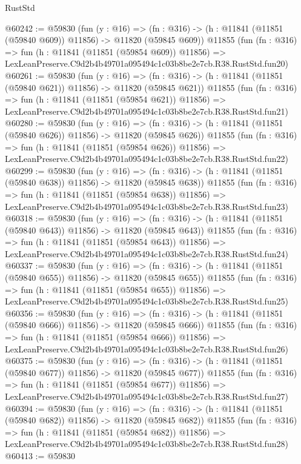 \begin{lexlean}{RustStd}
\begin{coremodule}
@60242 := @59830
    (fun (y : @16) =>
    (fn : @316) -> (h : @11841 (@11851 (@59840 @609)) @11856) -> @11820 (@59845 @609))
    @11855
    (fun (fn : @316) =>
    fun (h : @11841 (@11851 (@59854 @609)) @11856) =>
    LexLeanPreserve.C9d2b4b49701a095494c1c03b8be2e7cb.R38.RustStd.fun20)
@60261 := @59830
    (fun (y : @16) =>
    (fn : @316) -> (h : @11841 (@11851 (@59840 @621)) @11856) -> @11820 (@59845 @621))
    @11855
    (fun (fn : @316) =>
    fun (h : @11841 (@11851 (@59854 @621)) @11856) =>
    LexLeanPreserve.C9d2b4b49701a095494c1c03b8be2e7cb.R38.RustStd.fun21)
@60280 := @59830
    (fun (y : @16) =>
    (fn : @316) -> (h : @11841 (@11851 (@59840 @626)) @11856) -> @11820 (@59845 @626))
    @11855
    (fun (fn : @316) =>
    fun (h : @11841 (@11851 (@59854 @626)) @11856) =>
    LexLeanPreserve.C9d2b4b49701a095494c1c03b8be2e7cb.R38.RustStd.fun22)
@60299 := @59830
    (fun (y : @16) =>
    (fn : @316) -> (h : @11841 (@11851 (@59840 @638)) @11856) -> @11820 (@59845 @638))
    @11855
    (fun (fn : @316) =>
    fun (h : @11841 (@11851 (@59854 @638)) @11856) =>
    LexLeanPreserve.C9d2b4b49701a095494c1c03b8be2e7cb.R38.RustStd.fun23)
@60318 := @59830
    (fun (y : @16) =>
    (fn : @316) -> (h : @11841 (@11851 (@59840 @643)) @11856) -> @11820 (@59845 @643))
    @11855
    (fun (fn : @316) =>
    fun (h : @11841 (@11851 (@59854 @643)) @11856) =>
    LexLeanPreserve.C9d2b4b49701a095494c1c03b8be2e7cb.R38.RustStd.fun24)
@60337 := @59830
    (fun (y : @16) =>
    (fn : @316) -> (h : @11841 (@11851 (@59840 @655)) @11856) -> @11820 (@59845 @655))
    @11855
    (fun (fn : @316) =>
    fun (h : @11841 (@11851 (@59854 @655)) @11856) =>
    LexLeanPreserve.C9d2b4b49701a095494c1c03b8be2e7cb.R38.RustStd.fun25)
@60356 := @59830
    (fun (y : @16) =>
    (fn : @316) -> (h : @11841 (@11851 (@59840 @666)) @11856) -> @11820 (@59845 @666))
    @11855
    (fun (fn : @316) =>
    fun (h : @11841 (@11851 (@59854 @666)) @11856) =>
    LexLeanPreserve.C9d2b4b49701a095494c1c03b8be2e7cb.R38.RustStd.fun26)
@60375 := @59830
    (fun (y : @16) =>
    (fn : @316) -> (h : @11841 (@11851 (@59840 @677)) @11856) -> @11820 (@59845 @677))
    @11855
    (fun (fn : @316) =>
    fun (h : @11841 (@11851 (@59854 @677)) @11856) =>
    LexLeanPreserve.C9d2b4b49701a095494c1c03b8be2e7cb.R38.RustStd.fun27)
@60394 := @59830
    (fun (y : @16) =>
    (fn : @316) -> (h : @11841 (@11851 (@59840 @682)) @11856) -> @11820 (@59845 @682))
    @11855
    (fun (fn : @316) =>
    fun (h : @11841 (@11851 (@59854 @682)) @11856) =>
    LexLeanPreserve.C9d2b4b49701a095494c1c03b8be2e7cb.R38.RustStd.fun28)
@60413 := @59830

\end{coremodule}
\end{lexlean}
